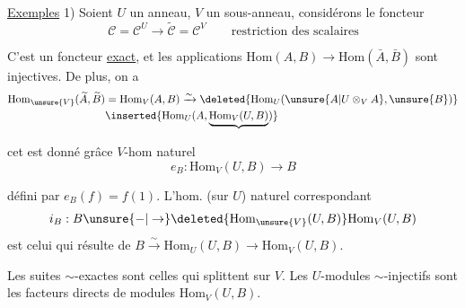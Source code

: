 
\uline{Exemples} 1) Soient $U$ un anneau, $V$ un sous-anneau, considérons le foncteur
\[
\mathcal C=\mathcal C^U\to\widetilde{\mathcal C}=\mathcal C^V\qquad\text{restriction des scalaires}
\]

C'est un foncteur \uline{exact}, et les applications $\mathrm{Hom}(A,B)\longrightarrow\mathrm{Hom}(\bar A,\bar B)$ sont injectives. De plus, on a
\[
\begin{aligned}
\mathrm{Hom}_{\unsure{V}}(\widetilde A,\widetilde B)&=\mathrm{Hom}_V(A,B)\xrightarrow{\sim}\deleted{\mathrm{Hom}_U(\unsure{A|U\otimes_V A},\unsure{B})}\\
&\inserted{\mathrm{Hom}_U(A,\underbrace{\mathrm{Hom}_V(U,B)})}
\end{aligned}
\]


cet   est donné grâce   $V$-hom naturel  
\[
e_B:\mathrm{Hom}_V(U,B)\longrightarrow B
\]

défini par  $e_B(f)=f(1)$. L'hom. (sur $U$) naturel correspondant
\[
i_B:B\unsure{-|\to}\deleted{\mathrm{Hom}_{\unsure{V}}(U,B)}\mathrm{Hom}_V(U,B)
\]
est celui qui résulte de $B\xrightarrow{\sim}\mathrm{Hom}_U(U,B)\to\mathrm{Hom}_V(U,B)$.

Les suites  $\sim$-exactes sont celles qui splittent sur $V$. Les $U$-modules $\sim$-injectifs sont les facteurs directs de modules $\mathrm{Hom}_V(U,B)$.

